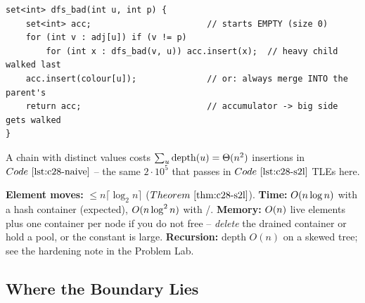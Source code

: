 \begin{lstlisting}[caption={the careless direction: merge the big container into the first small one -- quadratic on a chain}, label={lst:c28-naive}]
set<int> dfs_bad(int u, int p) {
    set<int> acc;                       // starts EMPTY (size 0)
    for (int v : adj[u]) if (v != p)
        for (int x : dfs_bad(v, u)) acc.insert(x);  // heavy child walked last
    acc.insert(colour[u]);              // or: always merge INTO the parent's
    return acc;                         // accumulator -> big side gets walked
}
\end{lstlisting}

A chain with distinct values costs \(\sum_u \operatorname{depth}(u)=\Theta(n^2)\) insertions
in \(\coderef{c28-naive}\) -- the same \(2\cdot10^5\) that passes in
\(\coderef{c28-s2l}\) TLEs here.

\begin{complexitybox}
\textbf{Element moves:} \(\le n\lceil\log_2 n\rceil\) (\(\thmref{c28-s2l}\)).
\textbf{Time:} \(O(n\log n)\) with a hash container (expected),
\(O(n\log^2 n)\) with /.  \textbf{Memory:}
\(O(n)\) live elements plus one container per node if you do not free --
\emph{delete} the drained container or hold a pool, or the constant is large.
\textbf{Recursion:} depth \(O(n)\) on a skewed tree; see the hardening note in
the Problem Lab.
\end{complexitybox}

\subsection{Where the Boundary Lies}

